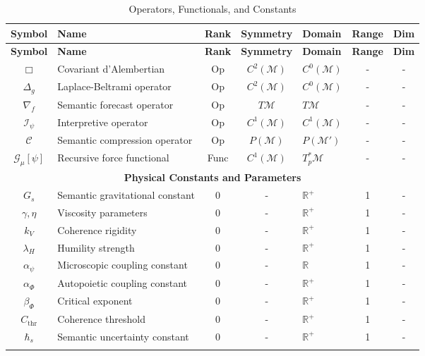 {\small
\renewcommand{\arraystretch}{1.1}
\begin{longtable}{|c|p{5.5cm}|c|c|p{1.8cm}|c|c|}
\hline
\textbf{Symbol} & \textbf{Name} & \textbf{Rank} & \textbf{Symmetry} & \textbf{Domain} & \textbf{Range} & \textbf{Dim} \\
\hline
\endfirsthead
\hline
\textbf{Symbol} & \textbf{Name} & \textbf{Rank} & \textbf{Symmetry} & \textbf{Domain} & \textbf{Range} & \textbf{Dim} \\
\hline
\endhead
\(\Box\) & Covariant d'Alembertian & Op & \(C^2(\mathcal{M})\) & \(C^0(\mathcal{M})\) & - & - \\
\hline
\(\Delta_g\) & Laplace-Beltrami operator & Op & \(C^2(\mathcal{M})\) & \(C^0(\mathcal{M})\) & - & - \\
\hline
\(\nabla_f\) & Semantic forecast operator & Op & \(T\mathcal{M}\) & \(T\mathcal{M}\) & - & - \\
\hline
\(\mathcal{I}_{\psi}\) & Interpretive operator & Op & \(C^1(\mathcal{M})\) & \(C^1(\mathcal{M})\) & - & - \\
\hline
\(\mathcal{C}\) & Semantic compression operator & Op & \(P(\mathcal{M})\) & \(P(\mathcal{M}')\) & - & - \\
\hline
\(\mathcal{G}_\mu[\psi]\) & Recursive force functional & Func & \(C^1(\mathcal{M})\) & \(T_p^*\mathcal{M}\) & - & - \\
\hline
\hline
\multicolumn{7}{|c|}{\textbf{Physical Constants and Parameters}} \\
\hline
\(G_s\) & Semantic gravitational constant & 0 & - & \(\mathbb{R}^+\) & 1 & - \\
\hline
\(\gamma, \eta\) & Viscosity parameters & 0 & - & \(\mathbb{R}^+\) & 1 & - \\
\hline
\(k_V\) & Coherence rigidity & 0 & - & \(\mathbb{R}^+\) & 1 & - \\
\hline
\(\lambda_H\) & Humility strength & 0 & - & \(\mathbb{R}^+\) & 1 & - \\
\hline
\(\alpha_{\psi}\) & Microscopic coupling constant & 0 & - & \(\mathbb{R}\) & 1 & - \\
\hline
\(\alpha_{\Phi}\) & Autopoietic coupling constant & 0 & - & \(\mathbb{R}^+\) & 1 & - \\
\hline
\(\beta_{\Phi}\) & Critical exponent & 0 & - & \(\mathbb{R}^+\) & 1 & - \\
\hline
\(C_{\text{thr}}\) & Coherence threshold & 0 & - & \(\mathbb{R}^+\) & 1 & - \\
\hline
\(\hbar_s\) & Semantic uncertainty constant & 0 & - & \(\mathbb{R}^+\) & 1 & - \\
\hline
\caption{Operators, Functionals, and Constants}
\end{longtable}
}


